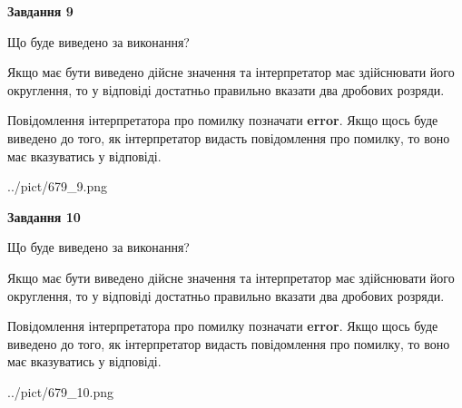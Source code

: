 \documentclass[12pt, ukrainian]{article}
\begin{document}
{\begin {Large}
{\begin {center}\textbf{Завдання 9}\end {center}}\par
Що буде виведено за виконання? \par

Якщо має бути виведено дійсне значення та інтерпретатор має здійснювати його округлення, 
то у відповіді достатньо правильно вказати два дробових розряди.

Повідомлення інтерпретатора про помилку позначати \textbf{error}.
Якщо щось буде виведено до того, як інтерпретатор видасть повідомлення про помилку, 
то воно має вказуватись у відповіді. \par

\begin{center}
	{../pict/679_9.png}
\end{center}
\newpage

{\begin {center}\textbf{Завдання 10}\end {center}}\par
Що буде виведено за виконання? \par

Якщо має бути виведено дійсне значення та інтерпретатор має здійснювати його округлення, 
то у відповіді достатньо правильно вказати два дробових розряди.

Повідомлення інтерпретатора про помилку позначати \textbf{error}.
Якщо щось буде виведено до того, як інтерпретатор видасть повідомлення про помилку, 
то воно має вказуватись у відповіді. \par

\begin{center}
	{../pict/679_10.png}
\end{center}
\newpage

\end {Large}}
\end{document}
